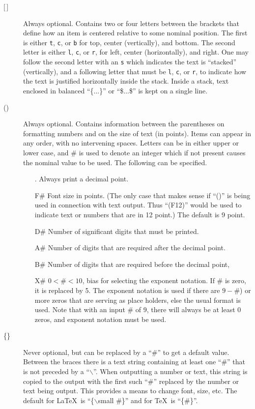 \documentclass[twoside]{MATH77}
\begin{document}
\begin{multicols}{2}
\begin{description}
\item[\hbox{[\,]}] Always optional.  Contains two or four letters between
the brackets that define how an item is centered relative to some nominal
position.  The first is either {\tt t}, {\tt c}, or {\tt b} for top,
center (vertically), and bottom.  The second letter is either {\tt l},
{\tt c}, or {\tt r}, for left, center (horizontally), and right.  One may
follow the second letter with an {\tt s} which indicates the text is
``stacked'' (vertically), and a following letter that must be {\tt l},
{\tt c}, or {\tt r}, to indicate how the text is justified horizontally
inside the stack. Inside a stack, text enclosed in balanced ``\{...\}'' or
``\$...\$'' is kept on a single line.
\item[()] Always optional.  Contains information between the parentheses
on formatting numbers and on the size of text (in points).  Items can
appear in any order, with no intervening spaces.  Letters can be in either
upper or lower case, and \# is used to denote an integer which if not
present causes the nominal value to be used.  The following can be
specified.
\begin{itemize}
\item[.] Always print a decimal point.
\item[F\#] Font size in points.  (The only case that
makes sense if ``()''
is being used in connection with text output.  Thus ``(F12)'' would be
used to indicate text or numbers that are in 12 point.)  The default is 9
point.
\item[D\#] Number of significant digits that must be printed.
\item[A\#] Number of digits that are required after the decimal point.
\item[B\#] Number of digits that are required before the decimal point,
\item[X\#] $0 < \# < 10$,  bias for selecting the exponent notation.  If
     \# is zero, it is replaced by 5.  The exponent notation is used if
     there are $9-\#$) or more zeros that are serving as place holders,
     else the usual format is used.  Note that with an input \# of 9,
     there will always be at least 0 zeros, and exponent notation must be
     used.
 \end{itemize}
\item[\{\}] Never optional, but can be replaced by a ``\#'' to get a
default value.  Between the braces there is a text string containing
at least one ``\#'' that is not preceded by a ``$\backslash$''.  When
outputting a number or text, this string is copied to the output with the
first such ``\#'' replaced by the number or text being output.  This
provides a means to change font, size, etc.  The default for \LaTeX\
is ``\{$\backslash $small \#\}'' and  for \TeX\ is ``\{\#\}''.
\end{description}\vspace{5pt}


\end{multicols}
\end{document}
